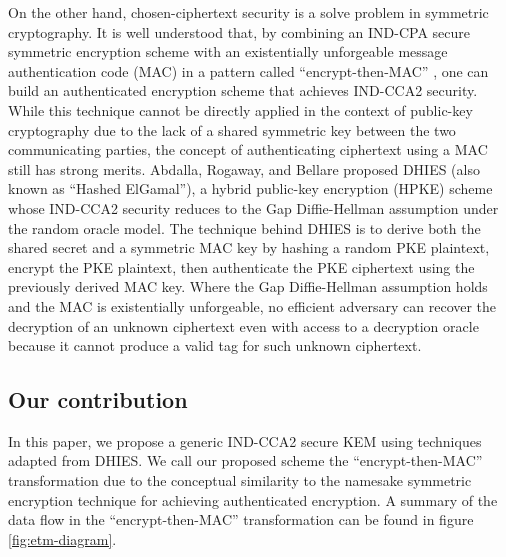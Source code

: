 \documentclass[journal=tches,submission]{iacrtrans}
\begin{document}
On the other hand, chosen-ciphertext security is a solve problem in symmetric cryptography. It is well understood that, by combining an IND-CPA secure symmetric encryption scheme with an existentially unforgeable message authentication code (MAC) in a pattern called ``encrypt-then-MAC'' \cite{DBLP:conf/crypto/Krawczyk01}, one can build an authenticated encryption scheme \cite{DBLP:conf/asiacrypt/BellareN00} that achieves IND-CCA2 security. While this technique cannot be directly applied in the context of public-key cryptography due to the lack of a shared symmetric key between the two communicating parties, the concept of authenticating ciphertext using a MAC still has strong merits. Abdalla, Rogaway, and Bellare proposed DHIES (also known as ``Hashed ElGamal'')\cite{DBLP:journals/iacr/AbdallaBR99}\cite{DBLP:conf/ctrsa/AbdallaBR01}, a hybrid public-key encryption (HPKE) scheme whose IND-CCA2 security reduces to the Gap Diffie-Hellman assumption \cite{DBLP:conf/pkc/OkamotoP01} under the random oracle model. The technique behind DHIES is to derive both the shared secret and a symmetric MAC key by hashing a random PKE plaintext, encrypt the PKE plaintext, then authenticate the PKE ciphertext using the previously derived MAC key. Where the Gap Diffie-Hellman assumption holds and the MAC is existentially unforgeable, no efficient adversary can recover the decryption of an unknown ciphertext even with access to a decryption oracle because it cannot produce a valid tag for such unknown ciphertext.

\subsection{Our contribution}
In this paper, we propose a generic IND-CCA2 secure KEM using techniques adapted from DHIES. We call our proposed scheme the ``encrypt-then-MAC'' transformation due to the conceptual similarity to the namesake symmetric encryption technique for achieving authenticated encryption. A summary of the data flow in the ``encrypt-then-MAC'' transformation can be found in figure \ref{fig:etm-diagram}.
\end{document}
